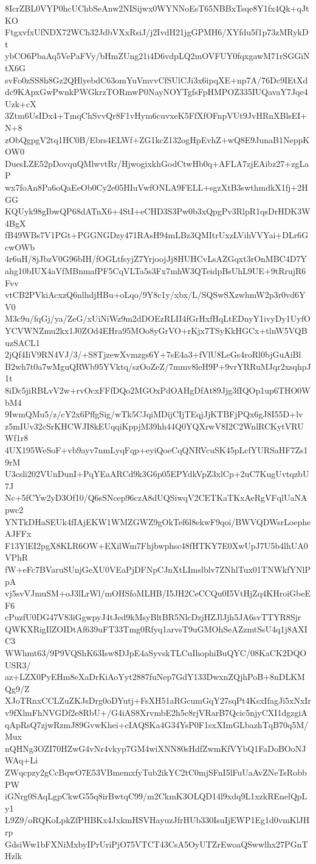 8IcrZBL0VYP0hcUChbSeAnw2NISijwx0WYNNoEsT65NBBxTsqe8Y1fx4Qk+qJtKO
FtgxvfxUfNDX72WCh32JdbVXxRsiJ/j2IvdH21jgGPMH6/XYfdu5f1p73zMRykDt
ybCO6PbaAq5VePaFVy/bHmZUng21i4D6vdpLQ2mOVFUY0fqxgawM71rSGGiNtX6G
svFo0zSS8h8Gz2QHlyebdC63omYuVmvvCfSUlCJi3x6ipqXE+np7A/76Dc9IEtXd
dc9KApxGwPwnkPWGkrzTORmwP0NayNOYTgfsFpHMPOZ335IUQavaY7Jqe4Uzk+cX
3Ztm6UsIDx4+TmqChSvvQr8F1vHym6cuvxeK5FfXfOFnpVUt9JvHRnXBlsEI+N+8
zObQgpgV2tq1HC0B/Ebrs4ELWf+ZG1kcZ132ogHpEvhZ+wQ8E9JunaB1NeppKOW0
DuesLZE52pDovquQMlwvtRr/HjwogixkhGodCtwHb0q+AFLA7zjEAibz27+zgLaP
wx7foAn8Pa6oQaEeOb0Cy2e05HIuVwfONLA9FELL+sgzXtB3swthmdkX1fj+2HGG
KQUyk98gIbwQP68dATnX6+4StI+eCHD3S3Pw0b3xQpgPv3RlpR1qsDrHDK3W4BgX
fB49WBs7V1PGt+PGGNGDzy471RAsH94mLBz3QMItrUxzLVihVVYai+DLr6GcwOWb
4r6uH/8jJbzV0G96bIH/fOGLtfsyjZ7YrjoojJj8HUHCvLsAZGqxt3rOnMBC4D7Y
ahg10bIUX4aVfMBnmafPF5CqVLTa5s3Fx7mhW3QTeidpBsUhL9UE+9tRrujR6Fvv
vtCB2PVkiAcxzQ6nlhdjHBu+oLqo/9Y8c1y/xbx/L/SQSwSXzwhmW2p3r0vd6YV0
M3c9u/fqGj/ya/ZeG/xUiNiWz9m2dDOEzRLII4fGrHxfHqLtEDnyY1ivyDy1UyfO
YCVWNZmu2kx1J0ZOd4EHra95MOo8yGrVO+rKjx7TSyKkHGCx+tlnW5VQBuzSACL1
2jQf4IiV9RN4VJ/3/+S8TjzewXvmzgs6Y+7sE4a3+fVlU8LeGs4roRl0bjGuAiBl
B2wh7t0a7wMguQRWb95YVktq/szOoZeZ/7mmv8leH9P+9vrYRRuMJqr2xsqhpJ1t
8iDc5jiRBLvV2w+rvOcxFFfDQo2MGOxPdOAHgDfAt89Jjg3fIQOp1up6THO0WbM4
9IwmQMu5/z/cY2x6PffgSig/wTk5CJqiMDijCIjTEqjJjKTBFjPQx6gJ8I55D+lv
z5mIUv32cSrKHCWJI8kEUqqiKppjM39hh44Q0YQXrwV8I2C2WnlRCKytVRUWf1r8
4UX195WeSoF+vb9ayv7nmLyqFqp+eyiQoeCqQNRVcuSK45pLcfYURSaHF7Zs19rM
U3csli202VUnDunI+PqYEaARCd9k3G6p05EPYdkVpZ3xlCp+2uC7KugUvtqzbU7J
Nc+5fCYw2yD3Of10/Q6sSNcep96czA8dUQSiwqV2CETKaTKxAeRgVFqlUaNApwc2
YNTkDHaSEUk4fIAjEKW1WMZGWZ9gOkTef6l8ekwF9qoi/BWVQDWsrLoepheAJFFx
F13YlEI2pgX8KLR6OW+EXilWm7Fhjbwphsc48fHTKY7E0XwUpJ7U5b4lhUA0VPhR
fW+eFc7BVaruSUnjGeXU0VEaPjDFNpCJnXtLImslblv7ZNhlTux01TNWkfYNlPpA
vj5svVJmuSM+oJ3lLrWl/mOHSfoMLHB/I5JH2CeCCQu0I5VtHjZq4KHroiGbeEF6
cPuzfU0DG47V83iGgwpyJ4tJed9kMsyBltBR5NlcDzjHZJlJjh5JA6svTTYR8Sjr
QWKXRigIlZOIDtAf639uFT33Tmg0Rfyq1arvsT9uGMOhSeAZzmtSsU4q1j8AXIC3
WWhmt63/9P9VQShK63Isw8DJpE4aSyvskTLCuIhophiBuQYC/08KaCK2DQOUSR3/
az+LZX0PyEHm8eXaDrKiAoYyt2887fuNep7GdY133DwxnZQjhPoB+8nDLKMQg9/Z
XJoTRnxCCLZuZKJsDrg0oDYutj+FsXH51aRGcumGqY27sqPt4KsxIfagJi5xNxIr
v9fXlmFhNVGDf2e8RbU+/G4iAS8XrvmbE2h5c8rjVRarB7Qcic5njyCXI1dgzgiA
qApRsQ7zjwRzmJ89GvwKhei+cIAQSKa4G34YsP0F1sxXImGLbazhTqB70q5M/Mux
nQHNg3OZI70HZwG4vNr4vkyp7GM4wiXNN80sHdfZwmKfVYbQ1FaDoBOoNJWAq+Li
ZWqcpzy2gCcBqwO7E53VBmemxfyTub2ikYC2tC0mjSFnI5lFuUaAvZNeTsRobbPW
iGNrg0SAqLgpCkwG55q8irBwtqC99/m2CkmK3OLQD14l9xdq9L1xzkREnelQpLy1
L9Z9/oRQKoLpkZfPHBKx4JxkmHSVHayuzJfrHUb330IsuIjEWP1Eg1d0vmKlJHrp
GdsiWw1bFXNiMxbyIPrUriPjO75VTCT43CsA5OyUTZrEwoaQSwwlhx27PGnTHzlk
